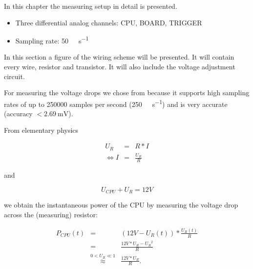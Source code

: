 In this chapter the measuring setup in detail is presented.



\begin{itemize}

\item Three differential analog channels: CPU, BOARD, TRIGGER

\item Sampling rate: \SI{50}{\kilo\samples\per\second}

\end{itemize}



In this section a figure of the wiring scheme will be presented. It will contain
every wire, resistor and transistor. It will also include the voltage adjustment
circuit.


\label{sec:measuring-device}

For measuring the voltage drops we chose \JWPni from
 because it supports high
sampling rates of up to 250000 samples per second
(\SI{250}{\kilo\samples\per\second}) and is very accurate (accuracy $<
\SI{2.69}{\milli\volt}$)\cite{NISpec2009}.


\label{sec:calc-work}

From elementary physics

\begin{eqnarray}
     U_R & = & R * I \\
  \iff I & = & \frac{U_R}{R}
\end{eqnarray}

and

\begin{equation}
  U_{CPU} + U_{R} = 12 V
\end{equation}

we obtain the instantaneous power of the CPU by measuring the voltage drop
across the (measuring) resistor:

\begin{eqnarray}
P_{CPU}(t) & = & (12V - U_R(t)) * \frac{U_R(t)}{R} \\
           & = & \frac{12V * U_R - {U_R}^2}{R} \\
           & \stackrel{0 < U_R \ll 1}{\approx} & \frac{12V * U_R}{R}.
\end{eqnarray}

